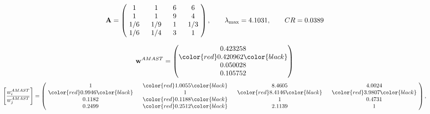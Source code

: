 \begin{example}
\begin{equation*}
\mathbf{A} =
\begin{pmatrix}
$\,\,$ 1 $\,\,$ & $\,\,$1$\,\,$ & $\,\,$6$\,\,$ & $\,\,$6 $\,\,$ \\
$\,\,$ 1 $\,\,$ & $\,\,$ 1 $\,\,$ & $\,\,$9$\,\,$ & $\,\,$4 $\,\,$ \\
$\,\,$ 1/6$\,\,$ & $\,\,$ 1/9$\,\,$ & $\,\,$ 1 $\,\,$ & $\,\,$ 1/3 $\,\,$ \\
$\,\,$ 1/6$\,\,$ & $\,\,$ 1/4$\,\,$ & $\,\,$3$\,\,$ & $\,\,$ 1  $\,\,$ \\
\end{pmatrix},
\qquad
\lambda_{\max} =
4.1031,
\qquad
CR = 0.0389
\end{equation*}

\begin{equation*}
\mathbf{w}^{AMAST} =
\begin{pmatrix}
0.423258\\
\color{red} 0.420962\color{black} \\
0.050028\\
0.105752
\end{pmatrix}\end{equation*}
\begin{equation*}
\left[ \frac{{w}^{AMAST}_i}{{w}^{AMAST}_j} \right] =
\begin{pmatrix}
$\,\,$ 1 $\,\,$ & $\,\,$\color{red} 1.0055\color{black} $\,\,$ & $\,\,$8.4605$\,\,$ & $\,\,$4.0024$\,\,$ \\
$\,\,$\color{red} 0.9946\color{black} $\,\,$ & $\,\,$ 1 $\,\,$ & $\,\,$\color{red} 8.4146\color{black} $\,\,$ & $\,\,$\color{red} 3.9807\color{black}   $\,\,$ \\
$\,\,$0.1182$\,\,$ & $\,\,$\color{red} 0.1188\color{black} $\,\,$ & $\,\,$ 1 $\,\,$ & $\,\,$0.4731 $\,\,$ \\
$\,\,$0.2499$\,\,$ & $\,\,$\color{red} 0.2512\color{black} $\,\,$ & $\,\,$2.1139$\,\,$ & $\,\,$ 1  $\,\,$ \\
\end{pmatrix},
\end{equation*}


\end{example}
